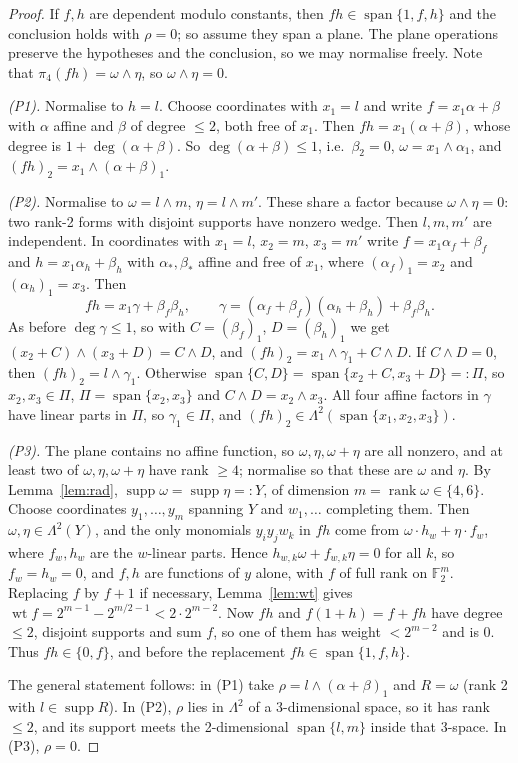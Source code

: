 \documentclass[11pt,a4paper]{article}
\theoremstyle{plain}
\theoremstyle{definition}
\theoremstyle{remark}
\newcommand{\F}{\mathbb{F}_2}
\newcommand{\Span}{\operatorname{span}}
\newcommand{\supp}{\operatorname{supp}}
\newcommand{\rk}{\operatorname{rank}}
\newcommand{\wt}{\operatorname{wt}}
\newcommand{\Lam}{\Lambda^{2}}
\begin{document}
\begin{proof}
If $f,h$ are dependent modulo constants, then $fh\in\Span\{1,f,h\}$ and the conclusion holds with $\rho=0$; so assume they span a plane. The plane operations preserve the hypotheses and the conclusion, so we may normalise freely. Note that $\pi_4(fh)=\omega\wedge\eta$, so $\omega\wedge\eta=0$.

\emph{(P1).} Normalise to $h=l$. Choose coordinates with $x_1=l$ and write $f=x_1\alpha+\beta$ with $\alpha$ affine and $\beta$ of degree $\le2$, both free of $x_1$. Then $fh=x_1(\alpha+\beta)$, whose degree is $1+\deg(\alpha+\beta)$. So $\deg(\alpha+\beta)\le1$, i.e.\ $\beta_2=0$, $\omega=x_1\wedge\alpha_1$, and $(fh)_2=x_1\wedge(\alpha+\beta)_1$.

\emph{(P2).} Normalise to $\omega=l\wedge m$, $\eta=l\wedge m'$. These share a factor because $\omega\wedge\eta=0$: two rank-2 forms with disjoint supports have nonzero wedge. Then $l,m,m'$ are independent. In coordinates with $x_1=l$, $x_2=m$, $x_3=m'$ write $f=x_1\alpha_f+\beta_f$ and $h=x_1\alpha_h+\beta_h$ with $\alpha_\ast,\beta_\ast$ affine and free of $x_1$, where $(\alpha_f)_1=x_2$ and $(\alpha_h)_1=x_3$. Then
\[
fh=x_1\gamma+\beta_f\beta_h,\qquad \gamma=(\alpha_f+\beta_f)(\alpha_h+\beta_h)+\beta_f\beta_h .
\]
As before $\deg\gamma\le1$, so with $C=(\beta_f)_1$, $D=(\beta_h)_1$ we get $(x_2+C)\wedge(x_3+D)=C\wedge D$, and $(fh)_2=x_1\wedge\gamma_1+C\wedge D$. If $C\wedge D=0$, then $(fh)_2=l\wedge\gamma_1$. Otherwise $\Span\{C,D\}=\Span\{x_2+C,x_3+D\}=:\Pi$, so $x_2,x_3\in\Pi$, $\Pi=\Span\{x_2,x_3\}$ and $C\wedge D=x_2\wedge x_3$. All four affine factors in $\gamma$ have linear parts in $\Pi$, so $\gamma_1\in\Pi$, and $(fh)_2\in\Lam(\Span\{x_1,x_2,x_3\})$.

\emph{(P3).} The plane contains no affine function, so $\omega,\eta,\omega+\eta$ are all nonzero, and at least two of $\omega,\eta,\omega+\eta$ have rank $\ge4$; normalise so that these are $\omega$ and $\eta$. By Lemma~\ref{lem:rad}, $\supp\omega=\supp\eta=:Y$, of dimension $m=\rk\omega\in\{4,6\}$. Choose coordinates $y_1,\dots,y_m$ spanning $Y$ and $w_1,\dots$ completing them. Then $\omega,\eta\in\Lam(Y)$, and the only monomials $y_iy_jw_k$ in $fh$ come from $\omega\cdot h_w+\eta\cdot f_w$, where $f_w,h_w$ are the $w$-linear parts. Hence $h_{w,k}\omega+f_{w,k}\eta=0$ for all $k$, so $f_w=h_w=0$, and $f,h$ are functions of $y$ alone, with $f$ of full rank on $\F^m$. Replacing $f$ by $f+1$ if necessary, Lemma~\ref{lem:wt} gives $\wt f=2^{m-1}-2^{m/2-1}<2\cdot 2^{m-2}$. Now $fh$ and $f(1+h)=f+fh$ have degree $\le2$, disjoint supports and sum $f$, so one of them has weight $<2^{m-2}$ and is $0$. Thus $fh\in\{0,f\}$, and before the replacement $fh\in\Span\{1,f,h\}$.

The general statement follows: in (P1) take $\rho=l\wedge(\alpha+\beta)_1$ and $R=\omega$ (rank 2 with $l\in\supp R$). In (P2), $\rho$ lies in $\Lam$ of a 3-dimensional space, so it has rank $\le2$, and its support meets the 2-dimensional $\Span\{l,m\}$ inside that 3-space. In (P3), $\rho=0$.
\end{proof}
\end{document}
